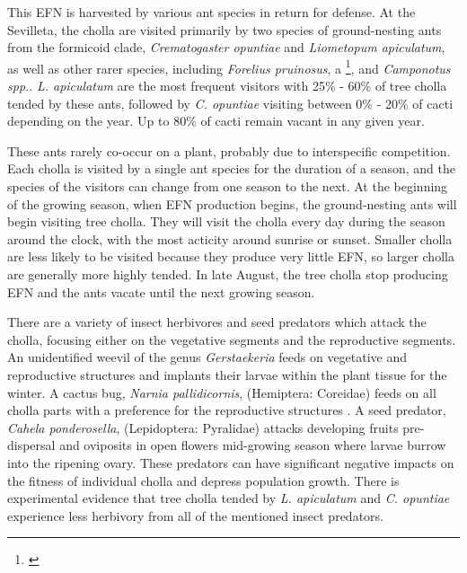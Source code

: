 \documentclass[12pt,a4paper]{article}
\newcommand{\tom}[2]{{\color{red}{#1}}\footnote{\textit{\color{red}{#2}}}}
\begin{document}
This EFN is harvested by various ant species in return for defense. 
At the Sevilleta, the cholla are visited primarily by two species of ground-nesting ants from the formicoid clade, \textit{Crematogaster opuntiae} and \textit{Liometopum apiculatum}, as well as other rarer species, including \textit{Forelius pruinosus}, a \tom{\textit{Phenogaster spp.}}{Incorrect spelling.}, and \textit{Camponotus spp.}.
\textit{L. apiculatum} are the most frequent visitors with 25\% - 60\% of tree cholla tended by these ants, followed by \textit{C. opuntiae} visiting between 0\% - 20\% of cacti\cite{Donald2022} depending on the year. 
Up to 80\% of cacti remain vacant in any given year. 

These ants rarely co-occur on a plant, probably due to interspecific competition\cite{Miller2007}.
Each cholla is visited by a single ant species for the duration of a season, and the species of the visitors can change from one season to the next. 
At the beginning of the growing season, when EFN production begins, the ground-nesting ants will begin visiting tree cholla.
They will visit the cholla every day during the season around the clock, with the most acticity around sunrise or sunset\cite{Ohm2014}. 
Smaller cholla are less likely to be visited because they produce very little EFN, so larger cholla are generally more highly tended\cite{Miller2014}. 
In late August, the tree cholla stop producing EFN and the ants vacate until the next growing season. 

There are a variety of insect herbivores and seed predators which attack the cholla, focusing either on the vegetative segments and the reproductive segments\cite{Mann1969}. 
An unidentified weevil of the genus \textit{Gerstaekeria} feeds on vegetative and reproductive structures and implants their larvae within the plant tissue for the winter. 
A cactus bug, \textit{Narnia pallidicornis}, (Hemiptera: Coreidae) feeds on all cholla parts with a preference for the reproductive structures \cite{Miller2006}.
A seed predator, \textit{Cahela ponderosella}, (Lepidoptera: Pyralidae) attacks developing fruits pre-dispersal and oviposits in open flowers mid-growing season where larvae burrow into the ripening ovary. 
These predators can have significant negative impacts on the fitness of individual cholla and depress population growth\cite{Miller2009}.
There is experimental evidence that tree cholla tended by \textit{L. apiculatum} and \textit{C. opuntiae} experience less herbivory from all of the mentioned insect predators\cite{Miller2007}. 
\end{document}
